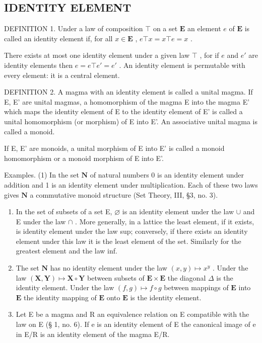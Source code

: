 \subsection{IDENTITY ELEMENT}

DEFINITION 1. Under a law of composition \(\top\) on a set \(\mathbf{E}\) an element \(e\) of \(\mathbf{E}\) is called an identity element if, for all \(x \in \mathbf{E}\) , \(e \top x = x \top e = x\) .

There exists at most one identity element under a given law \(\top\) , for if \(e\) and \(e'\) are identity elements then \(e = e \top e' = e'\) . An identity element is permutable with every element: it is a central element.

DEFINITION 2. A magma with an identity element is called a unital magma. If E, E' are unital magmas, a homomorphism of the magma E into the magma E' which maps the identity element of E to the identity element of E' is called a unital homomorphism (or morphism) of E into E'. An associative unital magma is called a monoid.

If E, E' are monoids, a unital morphism of E into E' is called a monoid homomorphism or a monoid morphism of E into E'.

Examples. (1) In the set \(\mathbf{N}\) of natural numbers 0 is an identity element under addition and 1 is an identity element under multiplication. Each of these two laws gives \(\mathbf{N}\) a commutative monoid structure (Set Theory, III, §3, no. 3).

\begin{enumerate}
\def\labelenumi{(\arabic{enumi})}
\setcounter{enumi}{1}
\item
  In the set of subsets of a set E, \(\varnothing\) is an identity element under the law \(\cup\) and E under the law \(\cap\) . More generally, in a lattice the least element, if it exists, is identity element under the law sup; conversely, if there exists an identity element under this law it is the least element of the set. Similarly for the greatest element and the law inf.
\item
  The set \(\mathbf{N}\) has no identity element under the law \((x, y) \mapsto x^y\) . Under the law \((\mathbf{X}, \mathbf{Y}) \mapsto \mathbf{X} \circ \mathbf{Y}\) between subsets of \(\mathbf{E} \times \mathbf{E}\) the diagonal \(\Delta\) is the identity element. Under the law \((f, g) \mapsto f \circ g\) between mappings of \(\mathbf{E}\) into \(\mathbf{E}\) the identity mapping of \(\mathbf{E}\) onto \(\mathbf{E}\) is the identity element.
\item
  Let E be a magma and R an equivalence relation on E compatible with the law on E (§ 1, no. 6). If e is an identity element of E the canonical image of e in E/R is an identity element of the magma E/R.
\end{enumerate}

